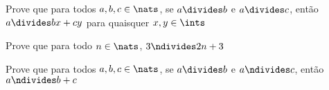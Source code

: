 \begin{exercise}
%
Prove que para todos $a, b, c \in \nats$, se $a \divides b$ e $a \divides c$, então $a \divides bx + cy$ para quaisquer $x, y \in \ints$
\end{exercise}

\begin{exercise}
%
Prove que para todo $n \in\nats$, $3 \ndivides 2n + 3$
\end{exercise}

\begin{exercise}
%
Prove que para todos $a, b, c \in\nats$, se $a \divides b$ e $a \ndivides c$, então $a \ndivides b + c$
\end{exercise}


